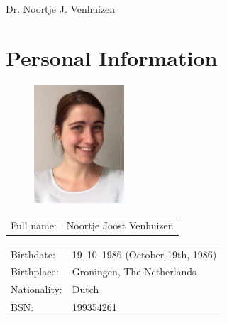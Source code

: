 \documentclass[a4paper,10pt]{article}
\def\leftcolwidth{.12\textwidth}
\def\tablevspace{10pt}
\begin{document}

\begin{flushright}
{\Huge Dr. Noortje J. Venhuizen}
\end{flushright}


\section*{Personal Information}

\begin{figure}
  \begin{flushright}
  \includegraphics[width=0.3\textwidth]{noortje.jpg}
  \end{flushright}
\end{figure}

\noindent
\begin{tabularx}{\textwidth}{ p{\leftcolwidth} X }
  Full name:      &         Noortje Joost Venhuizen\\
\end{tabularx}

\vspace{\tablevspace}

\noindent
\begin{tabularx}{\textwidth}{ p{\leftcolwidth} X }
  Birthdate:   &         19--10--1986 (October 19th, 1986)\\
  Birthplace:  &         Groningen, The Netherlands\\
  Nationality: &         Dutch\\
  BSN:         &         199354261\\
\end{tabularx}
\end{document}
